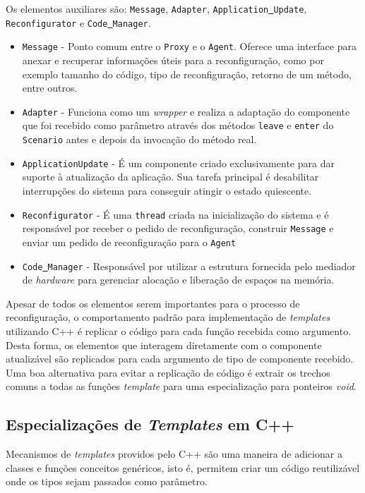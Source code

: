 \documentclass[12pt]{article}
\begin{document}
Os elementos auxiliares são:  \texttt{Message}, \texttt{Adapter}, \texttt{Application\underline{ }Update}, \texttt{Reconfigurator} e \texttt{Code\underline{ }Manager}.
\begin{itemize}
	\item \texttt{Message} - Ponto comum entre o \texttt{Proxy} e o \texttt{Agent}. Oferece uma interface para anexar e recuperar informações úteis para a reconfiguração, como por exemplo tamanho do código, tipo de reconfiguração, retorno de um método, entre outros.
	
	\item \texttt{Adapter} - Funciona como um \textit{wrapper} e realiza a adaptação do componente que foi recebido como parâmetro através dos métodos \texttt{leave} e \texttt{enter} do \texttt{Scenario} antes e depois da invocação do método real. 
	
	\item \texttt{Application\underline{}Update} - É um componente criado exclusivamente para dar suporte à atualização da aplicação. Sua tarefa principal é desabilitar interrupções do sistema para conseguir atingir o estado quiescente.
	
	\item \texttt{Reconfigurator} - É uma \texttt{thread} criada na inicialização do sistema e é responsável por receber o pedido de reconfiguração, construir \texttt{Message} e enviar um pedido de reconfiguração para o \texttt{Agent}
	
	\item \texttt{Code\underline{ }Manager} - Responsável por utilizar a estrutura fornecida pelo mediador de \textit{hardware} para gerenciar alocação e liberação de espaços na memória.
\end{itemize}


Apesar de todos os elementos serem importantes para o processo de reconfiguração, o comportamento padrão para implementação de \textit{templates} utilizando C++ é replicar o código para cada função recebida como argumento. Desta forma, os elementos que interagem diretamente com o componente atualizável são replicados para cada argumento de tipo de componente recebido. Uma boa alternativa para evitar a replicação de código é extrair os trechos comuns a todas as funções \textit{template} para uma especialização para ponteiros \textit{void}. 

\subsection{Especializações de \textit{Templates} em C++}
Mecanismos de \textit{templates} providos pelo C++ são uma maneira de adicionar a classes e funções conceitos genéricos, isto é, permitem criar um código reutilizável onde os tipos sejam passados como parâmetro.
\end{document}
